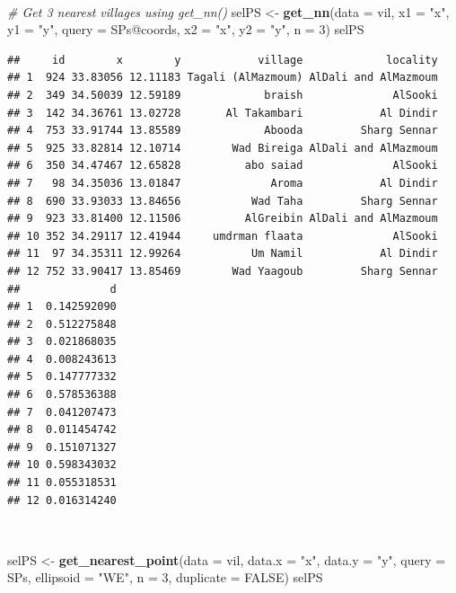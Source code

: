 \documentclass[11pt,a4paper]{article}
\newenvironment{Shaded}{}{}
\newcommand{\KeywordTok}[1]{\textcolor[rgb]{0.00,0.44,0.13}{\textbf{#1}}}
\newcommand{\DataTypeTok}[1]{\textcolor[rgb]{0.56,0.13,0.00}{#1}}
\newcommand{\DecValTok}[1]{\textcolor[rgb]{0.25,0.63,0.44}{#1}}
\newcommand{\StringTok}[1]{\textcolor[rgb]{0.25,0.44,0.63}{#1}}
\newcommand{\CommentTok}[1]{\textcolor[rgb]{0.38,0.63,0.69}{\textit{#1}}}
\newcommand{\OtherTok}[1]{\textcolor[rgb]{0.00,0.44,0.13}{#1}}
\newcommand{\OperatorTok}[1]{\textcolor[rgb]{0.40,0.40,0.40}{#1}}
\newcommand{\NormalTok}[1]{#1}
\begin{document}
~

\begin{Shaded}
\begin{Highlighting}[]
\CommentTok{# Get 3 nearest villages using get_nn()}
\NormalTok{selPS <-}\StringTok{ }\KeywordTok{get_nn}\NormalTok{(}\DataTypeTok{data =}\NormalTok{ vil, }\DataTypeTok{x1 =} \StringTok{"x"}\NormalTok{, }\DataTypeTok{y1 =} \StringTok{"y"}\NormalTok{, }
                \DataTypeTok{query =}\NormalTok{ SPs}\OperatorTok{@}\NormalTok{coords, }\DataTypeTok{x2 =} \StringTok{"x"}\NormalTok{, }\DataTypeTok{y2 =} \StringTok{"y"}\NormalTok{, }
                \DataTypeTok{n =} \DecValTok{3}\NormalTok{)}
\NormalTok{selPS}
\end{Highlighting}
\end{Shaded}

\begin{verbatim}
##     id        x        y            village             locality
## 1  924 33.83056 12.11183 Tagali (AlMazmoum) AlDali and AlMazmoum
## 2  349 34.50039 12.59189             braish              AlSooki
## 3  142 34.36761 13.02728       Al Takambari            Al Dindir
## 4  753 33.91744 13.85589             Abooda         Sharg Sennar
## 5  925 33.82814 12.10714        Wad Bireiga AlDali and AlMazmoum
## 6  350 34.47467 12.65828          abo saiad              AlSooki
## 7   98 34.35036 13.01847              Aroma            Al Dindir
## 8  690 33.93033 13.84656           Wad Taha         Sharg Sennar
## 9  923 33.81400 12.11506          AlGreibin AlDali and AlMazmoum
## 10 352 34.29117 12.41944     umdrman flaata              AlSooki
## 11  97 34.35311 12.99264           Um Namil            Al Dindir
## 12 752 33.90417 13.85469        Wad Yaagoub         Sharg Sennar
##              d
## 1  0.142592090
## 2  0.512275848
## 3  0.021868035
## 4  0.008243613
## 5  0.147777332
## 6  0.578536388
## 7  0.041207473
## 8  0.011454742
## 9  0.151071327
## 10 0.598343032
## 11 0.055318531
## 12 0.016314240
\end{verbatim}

~

\begin{Shaded}
\begin{Highlighting}[]
\NormalTok{selPS <-}\StringTok{ }\KeywordTok{get_nearest_point}\NormalTok{(}\DataTypeTok{data =}\NormalTok{ vil, }\DataTypeTok{data.x =} \StringTok{"x"}\NormalTok{, }\DataTypeTok{data.y =} \StringTok{"y"}\NormalTok{, }
                           \DataTypeTok{query =}\NormalTok{ SPs, }\DataTypeTok{ellipsoid =} \StringTok{"WE"}\NormalTok{,}
                           \DataTypeTok{n =} \DecValTok{3}\NormalTok{, }\DataTypeTok{duplicate =} \OtherTok{FALSE}\NormalTok{)}
\NormalTok{selPS}
\end{Highlighting}
\end{Shaded}
\end{document}
